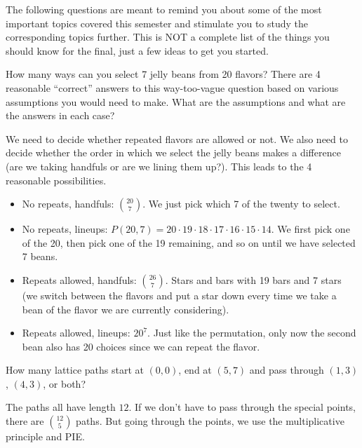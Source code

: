\documentclass[11pt]{exam}
\begin{document}

\noindent The following questions are meant to remind you about some of the most important topics covered this semester and stimulate you to study the corresponding topics further.  This is NOT a complete list of the things you should know for the final, just a few ideas to get you started.


\begin{questions}
\question How many ways can you select 7 jelly beans from 20 flavors?  There are 4 reasonable ``correct'' answers to this way-too-vague question based on various assumptions you would need to make.  What are the assumptions and what are the answers in each case?

\begin{solution}
We need to decide whether repeated flavors are allowed or not.  We also need to decide whether the order in which we select the jelly beans makes a difference (are we taking handfuls or are we lining them up?).  This leads to the 4 reasonable possibilities.

\begin{itemize}
\item No repeats, handfuls: ${20 \choose 7}$.  We just pick which 7 of the twenty to select.
\item No repeats, lineups: $P(20,7) = 20 \cdot 19 \cdot 18 \cdot 17 \cdot 16 \cdot 15 \cdot 14$.  We first pick one of the 20, then pick one of the 19 remaining, and so on until we have selected 7 beans.
\item Repeats allowed, handfuls: ${26 \choose 7}$.  Stars and bars with 19 bars and 7 stars (we switch between the flavors and put a star down every time we take a bean of the flavor we are currently considering).
\item Repeats allowed, lineups: $20^7$.  Just like the permutation, only now the second bean also has 20 choices since we can repeat the flavor.
\end{itemize}
\end{solution}

\vfill

\question How many lattice paths start at $(0,0)$, end at $(5,7)$ and pass through $(1,3)$, $(4,3)$, or both?

\begin{solution}
The paths all have length $12$.  If we don't have to pass through the special points, there are ${12\choose 5}$ paths.  But going through the points, we use the multiplicative principle and PIE.


\end{solution}
\end{questions}
\end{document}
